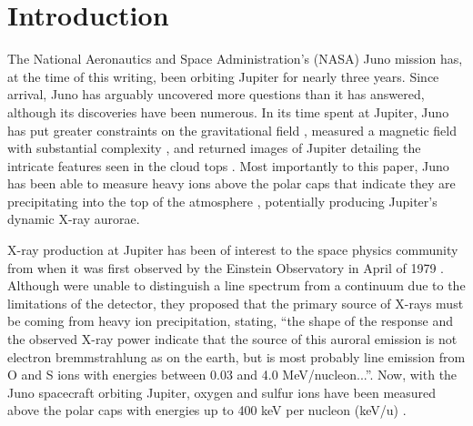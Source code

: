 \documentclass[draft]{agujournal2018}
\begin{document}
%
%

\section{Introduction}

The National Aeronautics and Space Administration's (NASA) Juno mission has, at the time of this writing, been orbiting Jupiter for nearly three years.
Since arrival, Juno has arguably uncovered more questions than it has answered, although its discoveries have been numerous.
In its time spent at Jupiter, Juno has put greater constraints on the gravitational field \citep{folkner2017,iess2018}, measured a magnetic field with substantial complexity \citep{connerney2017,connerney2018,moore2018}, and returned images of Jupiter detailing the intricate features seen in the cloud tops \citep{orton2017,sanchez2018}.
Most importantly to this paper, Juno has been able to measure heavy ions above the polar caps that indicate they are precipitating into the top of the atmosphere \citep{haggerty2017,clark2017a,clark2017b}, potentially producing Jupiter's dynamic X-ray aurorae.

X-ray production at Jupiter has been of interest to the space physics community from when it was first observed by the Einstein Observatory in April of 1979 \citep{metzger1983}.
Although \citet{metzger1983} were unable to distinguish a line spectrum from a continuum due to the limitations of the detector, they proposed that the primary source of X-rays must be coming from heavy ion precipitation, stating, ``the shape of the response and the observed X-ray power indicate that the source of this auroral emission is not electron bremmstrahlung as on the earth, but is most probably line emission from O and S ions with energies between 0.03 and 4.0 MeV/nucleon...''.
Now, with the Juno spacecraft orbiting Jupiter, oxygen and sulfur ions have been measured above the polar caps with energies up to 400 keV per nucleon (keV/u) \citep{clark2017a,clark2017b,haggerty2017}. 
\end{document}
